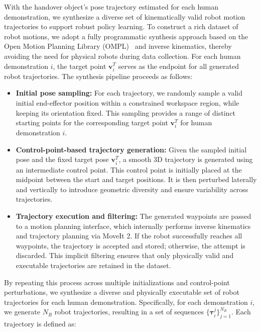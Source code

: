 \documentclass[final,5p,times,twocolumn]{elsarticle}
\begin{document}
With the handover object’s pose trajectory estimated for each human demonstration, we synthesize a diverse set of kinematically valid robot motion trajectories to support robust policy learning. To construct a rich dataset of robot motions, we adopt a fully programmatic synthesis approach based on the Open Motion Planning Library (OMPL)~\cite{sucan2012open} and inverse kinematics, thereby avoiding the need for physical robots during data collection. For each human demonstration $i$, the target point $\mathbf{v}_i^T$ serves as the endpoint for all generated robot trajectories. The synthesis pipeline proceeds as follows:
\begin{itemize}
\item \textbf{Initial pose sampling:} For each trajectory, we randomly sample a valid initial end-effector position within a constrained workspace region, while keeping its orientation fixed. This sampling provides a range of distinct starting points for the corresponding target point $\mathbf{v}_i^T$ for human demonstration $i$.

\item \textbf{Control-point-based trajectory generation:} Given the sampled initial pose and the fixed target pose $\mathbf{v}_i^T$, a smooth 3D trajectory is generated using an intermediate control point. This control point is initially placed at the midpoint between the start and target positions. It is then perturbed laterally and vertically to introduce geometric diversity and ensure variability across trajectories.

\item \textbf{Trajectory execution and filtering:} The generated waypoints are passed to a motion planning interface, which internally performs inverse kinematics and trajectory planning via MoveIt 2. If the robot successfully reaches all waypoints, the trajectory is accepted and stored; otherwise, the attempt is discarded. This implicit filtering ensures that only physically valid and executable trajectories are retained in the dataset.

\end{itemize}

By repeating this process across multiple initializations and control-point perturbations, we synthesize a diverse and physically executable set of robot trajectories for each human demonstration. Specifically, for each demonstration $i$, we generate $N_R$ robot trajectories, resulting in a set of sequences $\{ \boldsymbol{\tau}_{i}^{j} \}_{j=1}^{N_R}$. Each trajectory is defined as:
\end{document}
